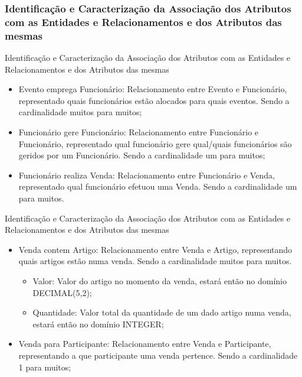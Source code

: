 \documentclass[compress,svgnames,handout,13.7pt]{beamer}
\begin{document}
\subsubsection{Identificação e Caracterização da Associação dos Atributos com as Entidades e Relacionamentos e dos Atributos das mesmas}
\begin{frame}{Identificação e Caracterização da Associação dos Atributos com as Entidades e Relacionamentos e dos Atributos das mesmas}
\begin{itemize}
                 \item{Evento emprega Funcionário:} Relacionamento entre Evento e Funcionário, representado quais funcionários estão alocados para quais eventos. Sendo a cardinalidade muitos para muitos;
                 \item{Funcionário gere Funcionário:} Relacionamento entre Funcionário e Funcionário, representado qual funcionário gere qual/quais funcionários são geridos por um Funcionário. Sendo a cardinalidade um para muitos;
                 \item{Funcionário realiza Venda:} Relacionamento entre Funcionário e Venda, representado qual funcionário efetuou uma Venda. Sendo a cardinalidade um para muitos.
\end{itemize}
\end{frame}
\begin{frame}{Identificação e Caracterização da Associação dos Atributos com as Entidades e Relacionamentos e dos Atributos das mesmas}
\begin{itemize}
                 \item{Venda contem Artigo:} Relacionamento entre Venda e Artigo, representando quais artigos estão numa venda. Sendo a cardinalidade muitos para muitos.
                     \begin{itemize}
                     \item{Valor:} Valor do artigo no momento da venda, estará então no domínio DECIMAL(5,2);
                       
                     \item{Quantidade:} Valor total da quantidade de um dado artigo numa venda, estará então no domínio INTEGER;
                       
                     \end{itemize}
                 \item{Venda para Participante:} Relacionamento entre Venda e Participante, representando a que participante uma venda pertence. Sendo a cardinalidade 1 para muitos;
\end{itemize}
\end{frame}
\end{document}
